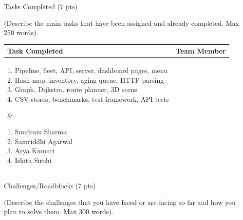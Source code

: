 \documentclass[12pt,a4paper]{article}
\newcommand{\sectiontitle}[1]{%
    {\color{GEUBlue}
    \fontsize{18}{22}\selectfont #1}
}
\newcommand{\instruction}[1]{%
    {\color{InstructionGrey}
    \fontsize{10.5}{13}\selectfont #1}
}
\begin{document}
\newpage


\vspace*{0.20cm}

\sectiontitle{Tasks Completed (7 pts)}

\vspace{0.05cm}

\instruction{
(Describe the main tasks that have been assigned and already completed.
Max 250 words).
}

\vspace{0.20cm}

\begin{tabularx}{\textwidth}{
|>{\raggedright\arraybackslash}X
|>{\raggedright\arraybackslash}X|
}
\hline

\textbf{Task Completed} &
\textbf{Team Member}
\\
\hline

\parbox[t][3.25cm][t]{\linewidth}{\small 1. Pipeline, fleet, API, server, dashboard pages, menu\\
2. Hash map, inventory, aging queue, HTTP parsing\\
3. Graph, Dijkstra, route planner, 3D scene\\
4. CSV stores, benchmarks, test framework, API tests\par}
&
\parbox[t][3.25cm][t]{\linewidth}{\small 1. Sundram Sharma\\
2. Samriddhi Agarwal\\
3. Arya Kumari\\
4. Ishita Sirohi\par}
\\
\hline

\end{tabularx}

\vspace{0.65cm}

\sectiontitle{Challenges/Roadblocks (7 pts)}

\vspace{0.05cm}

\instruction{
(Describe the challenges that you have faced or are facing so far
and how you plan to solve them. Max 300 words).
}

\vspace{0.18cm}
\end{document}
